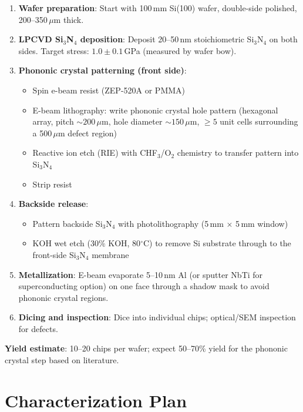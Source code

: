\documentclass[11pt]{article}
\begin{document}
\begin{enumerate}
\item \textbf{Wafer preparation}: Start with 100\,mm Si(100) wafer,
  double-side polished, 200--350\,$\mu$m thick.
\item \textbf{LPCVD Si$_3$N$_4$ deposition}: Deposit 20--50\,nm
  stoichiometric Si$_3$N$_4$ on both sides. Target stress:
  $1.0 \pm 0.1$\,GPa (measured by wafer bow).
\item \textbf{Phononic crystal patterning (front side)}:
  \begin{itemize}[nosep]
  \item Spin e-beam resist (ZEP-520A or PMMA)
  \item E-beam lithography: write phononic crystal hole pattern
    (hexagonal array, pitch $\sim 200$\,$\mu$m, hole diameter
    $\sim 150$\,$\mu$m, $\geq 5$ unit cells surrounding a
    500\,$\mu$m defect region)
  \item Reactive ion etch (RIE) with CHF$_3$/O$_2$ chemistry to
    transfer pattern into Si$_3$N$_4$
  \item Strip resist
  \end{itemize}
\item \textbf{Backside release}:
  \begin{itemize}[nosep]
  \item Pattern backside Si$_3$N$_4$ with photolithography (5\,mm
    $\times$ 5\,mm window)
  \item KOH wet etch (30\% KOH, 80$^\circ$C) to remove Si substrate
    through to the front-side Si$_3$N$_4$ membrane
  \end{itemize}
\item \textbf{Metallization}: E-beam evaporate 5--10\,nm Al (or
  sputter NbTi for superconducting option) on one face through a
  shadow mask to avoid phononic crystal regions.
\item \textbf{Dicing and inspection}: Dice into individual chips;
  optical/SEM inspection for defects.
\end{enumerate}

\textbf{Yield estimate}: 10--20 chips per wafer; expect 50--70\%
yield for the phononic crystal step based on literature.

\section{Characterization Plan}
\end{document}
